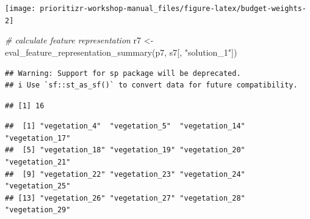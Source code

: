 \documentclass[
  12pt,
]{book}
\newenvironment{Shaded}{\begin{snugshade}}{\end{snugshade}}
\newcommand{\AttributeTok}[1]{\textcolor[rgb]{0.77,0.63,0.00}{#1}}
\newcommand{\CommentTok}[1]{\textcolor[rgb]{0.56,0.35,0.01}{\textit{#1}}}
\newcommand{\ConstantTok}[1]{\textcolor[rgb]{0.00,0.00,0.00}{#1}}
\newcommand{\FloatTok}[1]{\textcolor[rgb]{0.00,0.00,0.81}{#1}}
\newcommand{\FunctionTok}[1]{\textcolor[rgb]{0.00,0.00,0.00}{#1}}
\newcommand{\NormalTok}[1]{#1}
\newcommand{\OtherTok}[1]{\textcolor[rgb]{0.56,0.35,0.01}{#1}}
\newcommand{\SpecialCharTok}[1]{\textcolor[rgb]{0.00,0.00,0.00}{#1}}
\newcommand{\StringTok}[1]{\textcolor[rgb]{0.31,0.60,0.02}{#1}}
\begin{document}
\begin{center}\texttt{[image: prioritizr-workshop-manual\_files/figure-latex/budget-weights-2]} \end{center}

\begin{Shaded}
\begin{Highlighting}[]
\CommentTok{\# calculate feature representation}
\NormalTok{r7 }\OtherTok{\textless{}{-}} \FunctionTok{eval\_feature\_representation\_summary}\NormalTok{(p7, s7[, }\StringTok{"solution\_1"}\NormalTok{])}
\end{Highlighting}
\end{Shaded}

\begin{verbatim}
## Warning: Support for sp package will be deprecated.
## i Use `sf::st_as_sf()` to convert data for future compatibility.
\end{verbatim}

\begin{Shaded}
\end{Shaded}

\begin{verbatim}
## [1] 16
\end{verbatim}

\begin{Shaded}
\end{Shaded}

\begin{verbatim}
##  [1] "vegetation_4"  "vegetation_5"  "vegetation_14" "vegetation_17"
##  [5] "vegetation_18" "vegetation_19" "vegetation_20" "vegetation_21"
##  [9] "vegetation_22" "vegetation_23" "vegetation_24" "vegetation_25"
## [13] "vegetation_26" "vegetation_27" "vegetation_28" "vegetation_29"
\end{verbatim}
\end{document}
